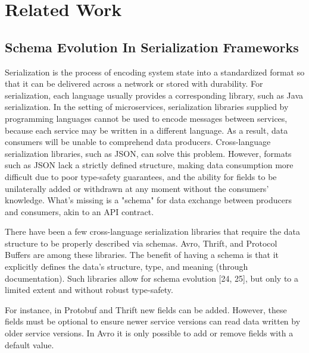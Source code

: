 
%

\chapter{Related Work}
\label{cha:related_work}

\section{Schema Evolution In Serialization Frameworks} %
\label{sec:schema_evolution_in_serialization_frameworks}

Serialization is the process of encoding system state into a standardized format so that it can be delivered across a network or stored with durability.
For serialization, each language usually provides a corresponding library, such as Java serialization.
In the setting of microservices, serialization libraries supplied by programming languages cannot be used to encode messages between services,
because each service may be written in a different language. As a result, data consumers will be unable to comprehend data producers.
Cross-language serialization libraries, such as JSON, can solve this problem.
However, formats such as JSON lack a strictly defined structure,
making data consumption more difficult due to poor type-safety guarantees, and the ability for fields to be unilaterally added or withdrawn at any moment without the consumers' knowledge.
What's missing is a "schema" for data exchange between producers and consumers, akin to an API contract.

There have been a few cross-language serialization libraries that require the data structure to be properly described via schemas.
Avro, Thrift, and Protocol Buffers are among these libraries.
The benefit of having a schema is that it explicitly defines the data's structure, type, and meaning (through documentation).
Such libraries allow for schema evolution [24, 25], but only to a limited extent and without robust type-safety.

For instance, in Protobuf and Thrift new fields can be added.
However, these fields must be optional to ensure newer service versions can read data written by older
service versions. In Avro it is only possible to add or remove fields with a default value.

